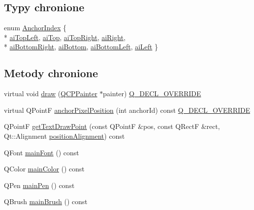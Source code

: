 \subsection*{Typy chronione}
\begin{DoxyCompactItemize}
\item 
enum \hyperlink{class_q_c_p_item_text_a14a84e58f72519c8ae1d7a4a1dd23f21}{Anchor\+Index} \{ \\*
\hyperlink{class_q_c_p_item_text_a14a84e58f72519c8ae1d7a4a1dd23f21a30342ee15065715f045cb52eb77b904c}{ai\+Top\+Left}, 
\hyperlink{class_q_c_p_item_text_a14a84e58f72519c8ae1d7a4a1dd23f21a55ce9699c71db6d264eb669bb0eb9aff}{ai\+Top}, 
\hyperlink{class_q_c_p_item_text_a14a84e58f72519c8ae1d7a4a1dd23f21a7b6ff56fcad4c78db0b793a96fce9580}{ai\+Top\+Right}, 
\hyperlink{class_q_c_p_item_text_a14a84e58f72519c8ae1d7a4a1dd23f21ad4faa7def46db6df2fedd1926237b48f}{ai\+Right}, 
\\*
\hyperlink{class_q_c_p_item_text_a14a84e58f72519c8ae1d7a4a1dd23f21af2072f259730ef47aa7ad7519f3a0255}{ai\+Bottom\+Right}, 
\hyperlink{class_q_c_p_item_text_a14a84e58f72519c8ae1d7a4a1dd23f21a5773ad69b7f4cd2724ba46d8f31b0688}{ai\+Bottom}, 
\hyperlink{class_q_c_p_item_text_a14a84e58f72519c8ae1d7a4a1dd23f21a489ec73da5a18c15e98a4f9b17ed301f}{ai\+Bottom\+Left}, 
\hyperlink{class_q_c_p_item_text_a14a84e58f72519c8ae1d7a4a1dd23f21a7f1c1b8c574c753e300a4759915a9170}{ai\+Left}
 \}
\end{DoxyCompactItemize}
\subsection*{Metody chronione}
\begin{DoxyCompactItemize}
\item 
virtual void \hyperlink{class_q_c_p_item_text_a8f8f075da83b6547c2b32e1f64cf0554}{draw} (\hyperlink{class_q_c_p_painter}{Q\+C\+P\+Painter} $\ast$painter) \hyperlink{qcustomplot_8hh_a42cc5eaeb25b85f8b52d2a4b94c56f55}{Q\+\_\+\+D\+E\+C\+L\+\_\+\+O\+V\+E\+R\+R\+I\+DE}
\item 
virtual Q\+PointF \hyperlink{class_q_c_p_item_text_afcdb1724d88d561f65da95fb54b0acb7}{anchor\+Pixel\+Position} (int anchor\+Id) const \hyperlink{qcustomplot_8hh_a42cc5eaeb25b85f8b52d2a4b94c56f55}{Q\+\_\+\+D\+E\+C\+L\+\_\+\+O\+V\+E\+R\+R\+I\+DE}
\item 
Q\+PointF \hyperlink{class_q_c_p_item_text_aa6e478b1ce198eace89157c4cacc3ddc}{get\+Text\+Draw\+Point} (const Q\+PointF \&pos, const Q\+RectF \&rect, Qt\+::\+Alignment \hyperlink{class_q_c_p_item_text_af13c6adc480f268116ae72196eb44b06}{position\+Alignment}) const 
\item 
Q\+Font \hyperlink{class_q_c_p_item_text_a23d391bd6471c45e73f45add67ede902}{main\+Font} () const 
\item 
Q\+Color \hyperlink{class_q_c_p_item_text_ad7bf17e4945cc86bbf9a36331da059a0}{main\+Color} () const 
\item 
Q\+Pen \hyperlink{class_q_c_p_item_text_a9ade32d362b22853659201c738269e2a}{main\+Pen} () const 
\item 
Q\+Brush \hyperlink{class_q_c_p_item_text_a10d6585a030633aa79d5ebc5a437f183}{main\+Brush} () const 
\end{DoxyCompactItemize}
